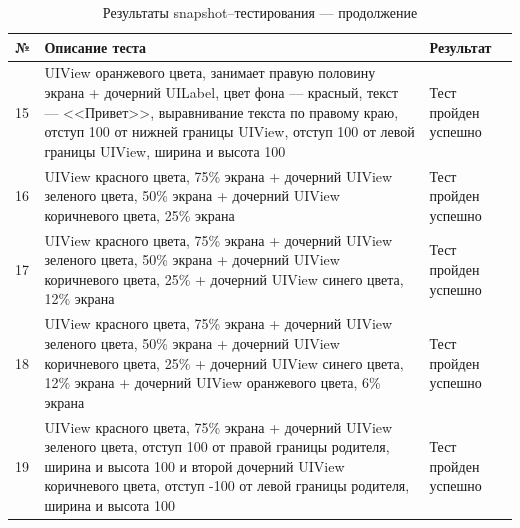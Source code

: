 \begin{table}[!htb]
 \label{table:tests3}
 \begin{center}
  \caption{Результаты snapshot--тестирования --- продолжение}
 \begin{tabular}{|p{0.6cm}|p{10cm}|p{5cm}|}
  \hline
   \bfseries № & \bfseries Описание теста & \bfseries Результат \\ \hline
   15 & UIView оранжевого цвета, занимает правую половину экрана + дочерний UILabel, цвет фона --- красный, текст --- <<Привет>>, выравнивание текста по правому краю, отступ 100 от нижней границы UIView, отступ 100 от левой границы UIView, ширина и высота 100 & Тест пройден успешно  \\ \hline
   16 & UIView красного цвета, 75\% экрана + дочерний UIView зеленого цвета, 50\% экрана + дочерний UIView коричневого цвета, 25\% экрана  & Тест пройден успешно  \\ \hline   
   17 & UIView красного цвета, 75\% экрана + дочерний UIView зеленого цвета, 50\% экрана + дочерний UIView коричневого цвета, 25\% + дочерний UIView синего цвета, 12\% экрана  & Тест пройден успешно  \\ \hline
   18 & UIView красного цвета, 75\% экрана + дочерний UIView зеленого цвета, 50\% экрана + дочерний UIView коричневого цвета, 25\% + дочерний UIView синего цвета, 12\% экрана + дочерний UIView оранжевого цвета, 6\% экрана  & Тест пройден успешно  \\ \hline
   19 & UIView красного цвета, 75\% экрана + дочерний UIView зеленого цвета, отступ 100 от правой границы родителя, ширина и высота 100 и второй дочерний UIView коричневого цвета, отступ -100 от левой границы родителя, ширина и высота 100 & Тест пройден успешно  \\ \hline
     \end{tabular}
 \end{center}
\end{table}

